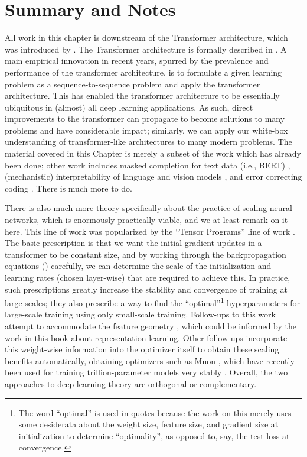 \documentclass[../../book-main.tex]{subfiles}
\begin{document}

\section{Summary and Notes}

All work in this chapter is downstream of the Transformer architecture, which was introduced by \citet{vaswani2017attention}. The Transformer architecture is formally described in . A main empirical innovation in recent years, spurred by the prevalence and performance of the transformer architecture, is to formulate a given learning problem as a sequence-to-sequence problem and apply the transformer architecture. This has enabled the transformer architecture to be essentially ubiquitous in (almost) all deep learning applications. As such, direct improvements to the transformer can propagate to become solutions to many problems and have considerable impact; similarly, we can apply our white-box understanding of transformer-like architectures to many modern problems. The material covered in this Chapter is merely a subset of the work which has already been done; other work includes masked completion for text data (i.e., BERT) \citep{devlin2019bert,yu2024white}, (mechanistic) interpretability of language and vision models \citep{bai2024improving}, and error correcting coding \citep{zheng2025white}. There is much more to do.

There is also much more theory specifically about the practice of scaling neural networks, which is enormously practically viable, and we at least remark on it here. This line of work was popularized by the ``Tensor Programs'' line of work \citep{yang2022tensor}. The basic prescription is that we want the initial gradient updates in a transformer to be constant size, and by working through the backpropagation equations () carefully, we can determine the scale of the initialization and learning rates (chosen layer-wise) that are required to achieve this. In practice, such prescriptions greatly increase the stability and convergence of training at large scales; they also prescribe a way to find the ``optimal''\footnote{The word ``optimal'' is used in quotes because the work on this merely uses some desiderata about the weight size, feature size, and gradient size at initialization to determine ``optimality'', as opposed to, say, the test loss at convergence.} hyperparameters for large-scale training using only small-scale training. Follow-ups to this work attempt to accommodate the feature geometry \citep{bernstein2024oldoptimizernewnorm}, which could be informed by the work in this book about representation learning. Other follow-ups incorporate this weight-wise information into the optimizer itself to obtain these scaling benefits automatically, obtaining optimizers such as Muon \citep{jordan6muon}, which have recently been used for training trillion-parameter models very stably \citep{moonshot2025kimi}. Overall, the two approaches to deep learning theory are orthogonal or complementary.
\end{document}
